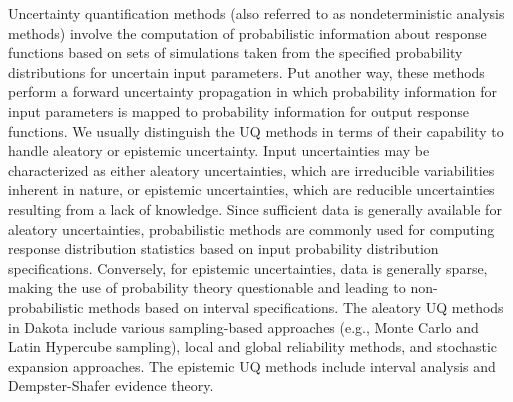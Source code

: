 Uncertainty quantification methods (also referred to as
nondeterministic analysis methods) involve the computation of
probabilistic information about response functions based on sets of
simulations taken from the specified probability distributions for
uncertain input parameters. Put another way, these methods perform a
forward uncertainty propagation in which probability information for
input parameters is mapped to probability information for output
response functions. We usually distinguish the UQ methods in terms of 
their capability to handle aleatory or epistemic uncertainty. 
Input uncertainties may be characterized as either aleatory
uncertainties, which are irreducible variabilities inherent in nature,
or epistemic uncertainties, which are reducible uncertainties
resulting from a lack of knowledge.  Since sufficient data is
generally available for aleatory uncertainties, probabilistic methods
are commonly used for computing response distribution statistics based
on input probability distribution specifications.  Conversely, for
epistemic uncertainties, data is generally sparse, making the use of
probability theory questionable and leading to non-probabilistic
methods based on interval specifications.
The aleatory UQ methods in Dakota include various
sampling-based approaches (e.g., Monte Carlo and Latin Hypercube
sampling), local and global reliability methods, and stochastic expansion
approaches.  The epistemic UQ methods include interval 
analysis and Dempster-Shafer evidence theory.

